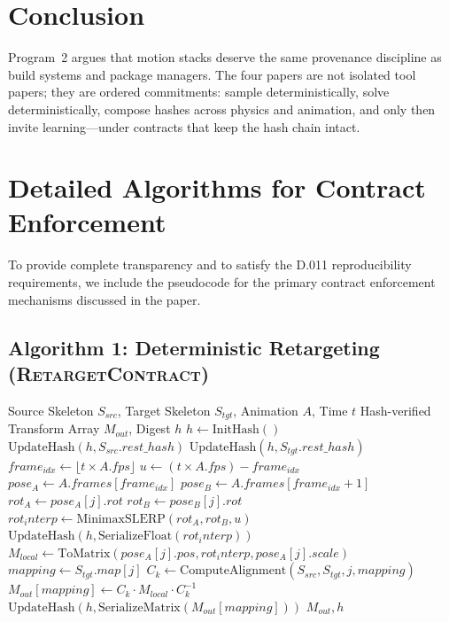 \documentclass[sigconf,nonacm]{acmart}
\newcommand{\retargetcontract}{\textsc{RetargetContract}}
\begin{document}
\section{Conclusion}

Program~2 argues that motion stacks deserve the same provenance discipline as build systems and package managers. The four papers are not isolated tool papers; they are ordered commitments: sample deterministically, solve deterministically, compose hashes across physics and animation, and only then invite learning---under contracts that keep the hash chain intact.

\appendix

\section{Detailed Algorithms for Contract Enforcement}

To provide complete transparency and to satisfy the D.011 reproducibility requirements, we include the pseudocode for the primary contract enforcement mechanisms discussed in the paper.

\subsection{Algorithm 1: Deterministic Retargeting (\retargetcontract{})}
\begin{algorithm}
\caption{Deterministic Skeletal Retargeting}
\label{alg:retarget}
\begin{algorithmic}[1]
\Require Source Skeleton $S_{src}$, Target Skeleton $S_{tgt}$, Animation $A$, Time $t$
\Ensure Hash-verified Transform Array $M_{out}$, Digest $h$
\State $h \gets \text{InitHash}()$
\State $\text{UpdateHash}(h, S_{src}.rest\_hash)$
\State $\text{UpdateHash}(h, S_{tgt}.rest\_hash)$
\State $frame_{idx} \gets \lfloor t \times A.fps \rfloor$
\State $u \gets (t \times A.fps) - frame_{idx}$
\State $pose_A \gets A.frames[frame_{idx}]$
\State $pose_B \gets A.frames[frame_{idx} + 1]$
    \State $rot_A \gets pose_A[j].rot$
    \State $rot_B \gets pose_B[j].rot$
    \State $rot_interp \gets \text{MinimaxSLERP}(rot_A, rot_B, u)$
    \State $\text{UpdateHash}(h, \text{SerializeFloat}(rot_interp))$
    \State $M_{local} \gets \text{ToMatrix}(pose_A[j].pos, rot_interp, pose_A[j].scale)$
    \State $mapping \gets S_{tgt}.map[j]$
        \State $C_k \gets \text{ComputeAlignment}(S_{src}, S_{tgt}, j, mapping)$
        \State $M_{out}[mapping] \gets C_k \cdot M_{local} \cdot C_k^{-1}$
        \State $\text{UpdateHash}(h, \text{SerializeMatrix}(M_{out}[mapping]))$
    \EndIf
\EndFor
\State \Return $M_{out}, h$
\end{algorithmic}
\end{algorithm}
\end{document}
